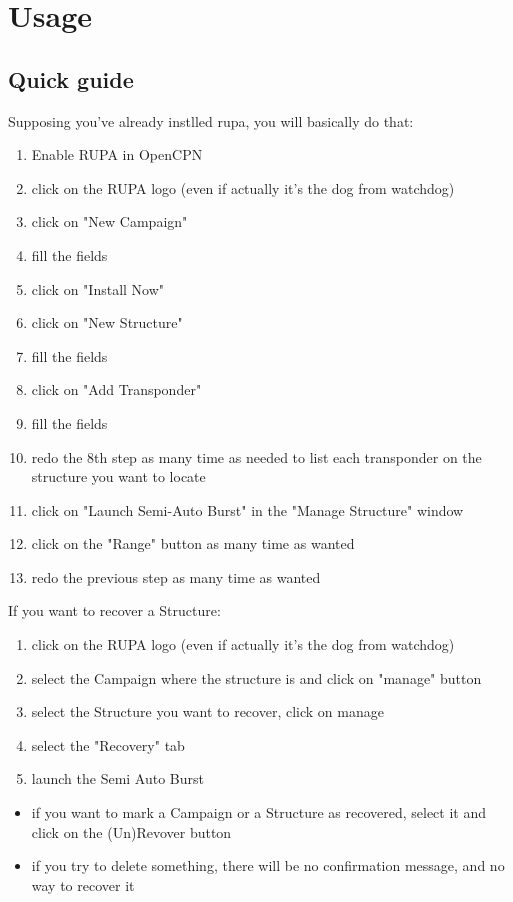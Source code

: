 \documentclass[11pt]{report}
\begin{document}
	    \chapter{Usage}
        \section{Quick guide}
        Supposing you've already instlled rupa, you will basically do that:
        \begin{enumerate}

            \item Enable RUPA in OpenCPN 
            \item click on the RUPA logo (even if actually it's the dog from watchdog)
            \item click on "New Campaign"
            \item fill the fields
            \item click on "Install Now"
            \item click on "New Structure"
            \item fill the fields
            \item click on "Add Transponder"
            \item fill the fields
            \item redo the 8th step as many time as needed to list each transponder on the structure you want to locate
            \item click on "Launch Semi-Auto Burst" in the "Manage Structure" window
            \item click on the "Range" button as many time as wanted
            \item redo the previous step as many time as wanted
        \end{enumerate}
        \vspace{1cm}
        If you want to recover a Structure:
        \begin{enumerate}
            \item click on the RUPA logo (even if actually it's the dog from watchdog)
            \item select the Campaign where the structure is and click on "manage" button
            \item select the Structure you want to recover, click on manage
            \item select the "Recovery" tab
            \item launch the Semi Auto Burst
        \end{enumerate}
        \vspace{1cm}
        \begin{itemize}
            \item if you want to mark a Campaign or a Structure as recovered, select it and click on the (Un)Revover button
            \item if you try to delete something, there will be no confirmation message, and no way to recover it
        \end{itemize}
\newpage
\end{document}
